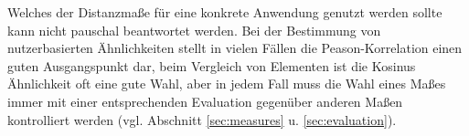 Welches der Distanzmaße für eine konkrete Anwendung genutzt werden sollte kann nicht pauschal beantwortet werden. Bei der Bestimmung von nutzerbasierten Ähnlichkeiten stellt in vielen Fällen die Peason-Korrelation einen guten Ausgangspunkt dar, beim Vergleich von Elementen ist die Kosinus Ähnlichkeit oft eine gute Wahl, aber in jedem Fall muss die Wahl eines Maßes immer mit einer entsprechenden Evaluation gegenüber anderen Maßen kontrolliert werden (vgl. Abschnitt \ref{sec:measures} u. \ref{sec:evaluation}).
